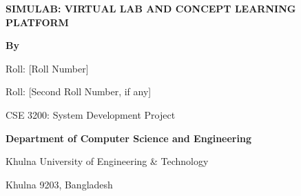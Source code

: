 \documentclass[12pt,a4paper]{report}
\begin{document}
\begin{titlepage}
\thispagestyle{empty}
\centering
\vspace*{0.5in}
{\bfseries\fontsize{18}{22}\selectfont SIMULAB: VIRTUAL LAB AND CONCEPT LEARNING PLATFORM\par}
\vspace{0.6in}
{\bfseries\fontsize{14}{18}\selectfont By\par}
\vspace{0.35in}
{\fontsize{14}{18}\par}
{\fontsize{14}{18}\selectfont Roll: [Roll Number]\par}
\vspace{0.2in}
{\fontsize{14}{18}\par}
{\fontsize{14}{18}\selectfont Roll: [Second Roll Number, if any]\par}
\vspace{0.8in}
{\fontsize{14}{18}\selectfont CSE 3200: System Development Project\par}
\vfill
{\bfseries\fontsize{12}{15}\selectfont Department of Computer Science and Engineering\par}
{\fontsize{12}{15}\selectfont Khulna University of Engineering \& Technology\par}
{\fontsize{12}{15}\selectfont Khulna 9203, Bangladesh\par}
{\fontsize{12}{15}\par}
\end{titlepage}
\end{document}
